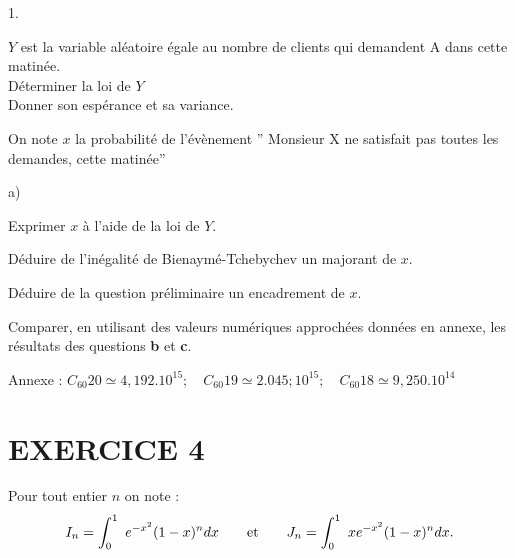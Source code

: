 \documentclass[11pt]{article}%
\begin{document}
\begin{noliste}{1.}
 \setlength{\itemsep}{4mm}
\item $Y$ est la variable aléatoire égale au nombre de clients qui
demandent
A dans cette matinée.\\
Déterminer la loi de $Y$\\
Donner son espérance et sa variance.

\item On note $x$ la probabilité de l'évènement \textquotedblright
Monsieur
X ne satisfait pas toutes les demandes, cette matinée\textquotedblright

\begin{noliste}{a)}
 \setlength{\itemsep}{2mm}
\item Exprimer $x$ à l'aide de la loi de $Y.$

\item Déduire de l'inégalité de Bienaymé-Tchebychev un majorant de $x.$

\item Déduire de la question préliminaire un encadrement de $x.$

\item Comparer, en utilisant des valeurs numériques approchées données
en
annexe, les résultats des questions \textbf{b} et \textbf{c}.
\end{noliste}
\end{noliste}

\noindent Annexe : $C_{60}{20}\simeq 4,192.10^{15};\quad
C_{60}{19}\simeq
2.045;10^{15};\quad C_{60}{18}\simeq 9,250.10^{14}$

\section*{EXERCICE 4}

Pour tout entier $n$ on note : 
\[
I_{n} = \displaystyle \int_{0}^{1}\ e^{-x^{2}}(1-x)^{n}dx\qquad \text{et\qquad }J_{n} =
\displaystyle \int_{0}^{1}\ xe^{-x^{2}}(1-x)^{n}dx.
\]
\end{document}
